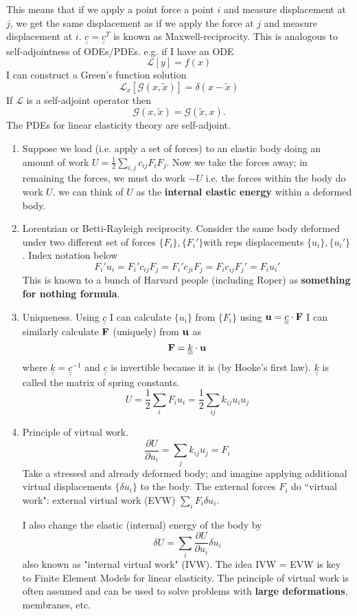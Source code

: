 \documentclass[12pt]{article}
\newcommand{\uu}{{\bf u}}
\newcommand{\FF}{{\bf F}}
\newcommand{\kk}{{\underline{\underline{k}}}}
\newcommand{\cc}{{\underline{\underline c}}}
\newcommand{\GG}{{\mathcal G}}
\newcommand{\LL}{{\mathcal L}}
\begin{document}
This means that if we apply a point force a point $i$ and measure displacement at $j$, we get the same displacement as if we apply the force at $j$ and measure displacement at $i$.
$\cc = \cc^T$ is known as Maxwell-reciprocity. This is analogous to self-adjointness of ODEs/PDEs. e.g. if I have an ODE
\[
\LL[y] = f(x)
\]
I can construct a Green's function solution
\[
\LL_x[\GG(x,\tilde x )] = \delta(x-\tilde x )
\]
If $\LL$ is a self-adjoint operator then 
\[
\GG(x, \tilde x) = \GG(\tilde x, x).
\]
The PDEs for linear elasticity theory are self-adjoint.

\begin{enumerate}
\item
Suppose we load (i.e. apply a set of forces) to an elastic body doing an amount of work $U = \frac 1 2 \sum_{i,j}c_{ij}F_iF_j$.
Now we take the forces away; in remaining the forces, we must do work $-U$ i.e. the forces within the body do work $U$. we can think of $U$ as the {\bf internal elastic energy} within a deformed body.
 
 \item {Lorentzian or Betti-Rayleigh reciprocity.}
 Consider the same body deformed under two different set of forces $\{F_i\}, \{F_i'\}$with reps displacements $\{u_i\}, \{u_i'\}$. Index notation below
 \[
F_i'u_i = F_i' c_{ij}F_j =  F_i' c_{ji}F_j = F_i c_{ij}F_j' = F_i u_i' 
 \]
 This is known to a bunch of Harvard people (including Roper) as {\bf something for nothing formula}.
 
 \item {Uniqueness.} Using $\cc$ I can calculate $\{u_i\}$ from $\{F_i\}$ using $\uu  = \cc\cdot\FF$
 I can similarly calculate $\FF$ (uniquely) from $\uu$ as 
 \[
\FF = \kk\cdot \uu
 \]
 where $\kk= \cc^{-1}$ and $\cc$ is invertible because it is (by Hooke's first law).
 $\kk$ is called the matrix of spring constants.
 \[
 U= \frac 1 2 \sum_i F_i u_i = \frac 1 2 \sum_{ij} k_{ij}u_iu_j
 \]
 
 
 \item Principle of virtual work.
 \[
\frac{\partial U}{\partial u_i} = \sum_j k_{ij}u_j = F_i
 \]
 Take a stressed and already deformed body; and imagine applying additional virtual displacements $\{\delta u_i\}$ to the body. The external forces $F_i$ do ``virtual work": external virtual work (EVW) $ \sum_i F_i\delta u_i$.
 
 I also change the elastic (internal) energy of the body by 
 \[
\delta U = \sum_i \frac{\partial U}{\partial u_i} \delta u_i
 \]
 also known as "internal virtual work" (IVW). The idea IVW = EVW is key to Finite Element Models for linear elasticity. The principle of virtual work is often assumed and can be used to solve problems with {\bf large deformations}, membranes, etc.
\end{enumerate}
\end{document}
